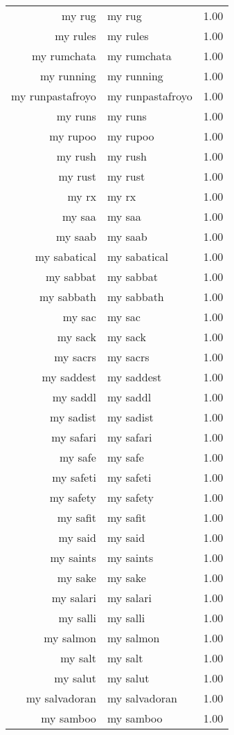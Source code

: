 \begin{table}[ht]
\begin{tabular}{rlr}
  my rug & my rug & 1.00 \\ 
  my rules & my rules & 1.00 \\ 
  my rumchata & my rumchata & 1.00 \\ 
  my running & my running & 1.00 \\ 
  my runpastafroyo & my runpastafroyo & 1.00 \\ 
  my runs & my runs & 1.00 \\ 
  my rupoo & my rupoo & 1.00 \\ 
  my rush & my rush & 1.00 \\ 
  my rust & my rust & 1.00 \\ 
  my rx & my rx & 1.00 \\ 
  my saa & my saa & 1.00 \\ 
  my saab & my saab & 1.00 \\ 
  my sabatical & my sabatical & 1.00 \\ 
  my sabbat & my sabbat & 1.00 \\ 
  my sabbath & my sabbath & 1.00 \\ 
  my sac & my sac & 1.00 \\ 
  my sack & my sack & 1.00 \\ 
  my sacrs & my sacrs & 1.00 \\ 
  my saddest & my saddest & 1.00 \\ 
  my saddl & my saddl & 1.00 \\ 
  my sadist & my sadist & 1.00 \\ 
  my safari & my safari & 1.00 \\ 
  my safe & my safe & 1.00 \\ 
  my safeti & my safeti & 1.00 \\ 
  my safety & my safety & 1.00 \\ 
  my safit & my safit & 1.00 \\ 
  my said & my said & 1.00 \\ 
  my saints & my saints & 1.00 \\ 
  my sake & my sake & 1.00 \\ 
  my salari & my salari & 1.00 \\ 
  my salli & my salli & 1.00 \\ 
  my salmon & my salmon & 1.00 \\ 
  my salt & my salt & 1.00 \\ 
  my salut & my salut & 1.00 \\ 
  my salvadoran & my salvadoran & 1.00 \\ 
  my samboo & my samboo & 1.00 \\ 

\end{tabular}
\end{table}
